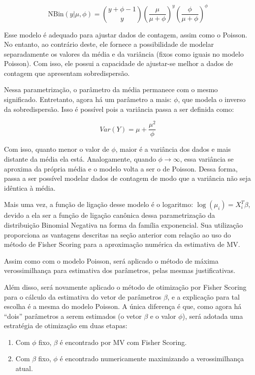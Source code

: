 \documentclass[
  twocolumn]{article}
\providecommand{\tightlist}{%
  \setlength{\itemsep}{0pt}\setlength{\parskip}{0pt}}
\begin{document}
\[
\text{NBin}(y | \mu, \phi) = \binom{y+\phi-1}{y} \left(\dfrac{\mu}{\mu+\phi}\right)^y \left(\dfrac{\phi}{\mu+\phi}\right)^\phi
\]

Esse modelo é adequado para ajustar dados de contagem, assim como o
Poisson. No entanto, ao contrário deste, ele fornece a possibilidade de
modelar separadamente os valores da média e da variância (fixos como
iguais no modelo Poisson). Com isso, ele possui a capacidade de
ajustar-se melhor a dados de contagem que apresentam sobredispersão.

Nessa parametrização, o parâmetro da média permanece com o mesmo
significado. Entretanto, agora há um parâmetro a mais: \(\phi\), que
modela o inverso da sobredispersão. Isso é possível pois a variância
passa a ser definida como:

\[
Var(Y) = \mu + \dfrac{\mu^2}{\phi}
\]

Com isso, quanto menor o valor de \(\phi\), maior é a variância dos
dados e mais distante da média ela está. Analogamente, quando
\(\phi \rightarrow \infty\), essa variância se aproxima da própria média
e o modelo volta a ser o de Poisson. Dessa forma, passa a ser possível
modelar dados de contagem de modo que a variância não seja idêntica à
média.

Mais uma vez, a função de ligação desse modelo é o logaritmo:
\(\log(\mu_i) = X_i^T\beta\), devido a ela ser a função de ligação
canônica dessa parametrização da distribuição Binomial Negativa na forma
da família exponencial. Sua utilização proporciona as vantagens
descritas na seção anterior com relação ao uso do método de Fisher
Scoring para a aproximação numérica da estimativa de MV.

Assim como com o modelo Poisson, será aplicado o método de máxima
verossimilhança para estimativa dos parâmetros, pelas mesmas
justificativas.

Além disso, será novamente aplicado o método de otimização por Fisher
Scoring para o cálculo da estimativa do vetor de parâmetros \(\beta\), e
a explicação para tal escolha é a mesma do modelo Poisson. A única
diferença é que, como agora há ``dois'' parâmetros a serem estimados (o
vetor \(\beta\) e o valor \(\phi\)), será adotada uma estratégia de
otimização em duas etapas:

\begin{enumerate}
\def\labelenumi{\arabic{enumi}.}
\tightlist
\item
  Com \(\phi\) fixo, \(\beta\) é encontrado por MV com Fisher Scoring.
\item
  Com \(\beta\) fixo, \(\phi\) é encontrado numericamente maximizando a
  verossimilhança atual.
\end{enumerate}
\end{document}

